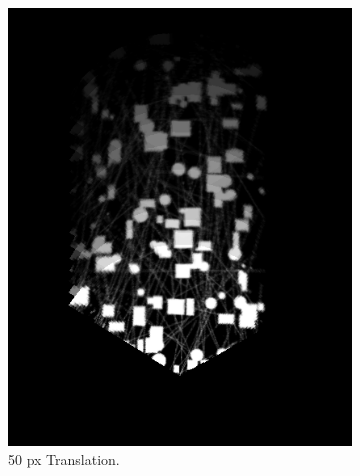 \begin{figure}[H]
\begin{subfigure}[b]{0.47\textwidth}
        \includegraphics[width=\textwidth]{figures/results/Translation-Surge-Combined/PC-4.png}
        \caption{50 px Translation.}
    \end{subfigure}
    \hfill
    \begin{subfigure}[b]{0.47\textwidth}
        \centering

\end{subfigure}
\end{figure}
